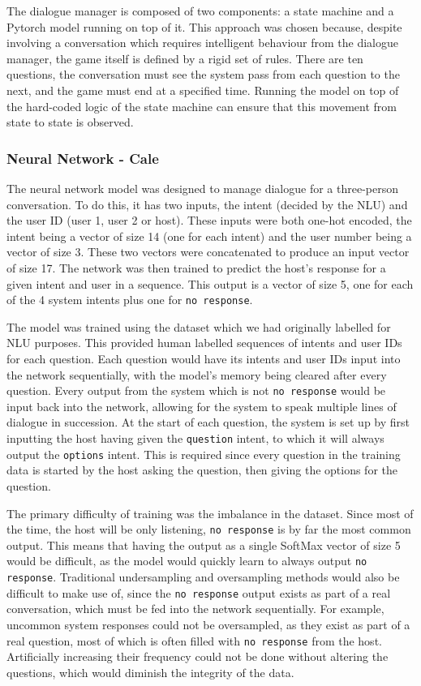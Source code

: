 \documentclass[hidelinks, 11pt]{article}
\begin{document}
The dialogue manager is composed of two components: a state machine and a Pytorch model running on top of it. This approach was chosen because, despite involving a conversation which requires intelligent behaviour from the dialogue manager, the game itself is defined by a rigid set of rules. There are ten questions, the conversation must see the system pass from each question to the next, and the game must end at a specified time. Running the model on top of the hard-coded logic of the state machine can ensure that this movement from state to state is observed. 

\subsubsection{Neural Network - Cale}
\label{subsec:nn}
The neural network model was designed to manage dialogue for a three-person conversation. To do this, it has two inputs, the intent (decided by the NLU) and the user ID (user 1, user 2 or host). These inputs were both one-hot encoded, the intent being a vector of size 14 (one for each intent) and the user number being a vector of size 3. These two vectors were concatenated to produce an input vector of size 17. The network was then trained to predict the host's response for a given intent and user in a sequence. This output is a vector of size 5, one for each of the 4 system intents plus one for \verb|no response|.

The model was trained using the dataset which we had originally labelled for NLU purposes. This provided human labelled sequences of intents and user IDs for each question. Each question would have its intents and user IDs input into the network sequentially, with the model's memory being cleared after every question. Every output from the system which is not \verb|no response| would be input back into the network, allowing for the system to speak multiple lines of dialogue in succession. At the start of each question, the system is set up by first inputting the host having given the \verb|question| intent, to which it will always output the \verb|options| intent. This is required since every question in the training data is started by the host asking the question, then giving the options for the question.

The primary difficulty of training was the imbalance in the dataset. Since most of the time, the host will be only listening, \verb|no response| is by far the most common output. This means that having the output as a single SoftMax vector of size 5 would be difficult, as the model would quickly learn to always output \verb|no response|. Traditional undersampling and oversampling methods would also be difficult to make use of, since the \verb|no response| output exists as part of a real conversation, which must be fed into the network sequentially. For example, uncommon system responses could not be oversampled, as they exist as part of a real question, most of which is often filled with \verb|no response| from the host. Artificially increasing their frequency could not be done without altering the questions, which would diminish the integrity of the data.
\end{document}
